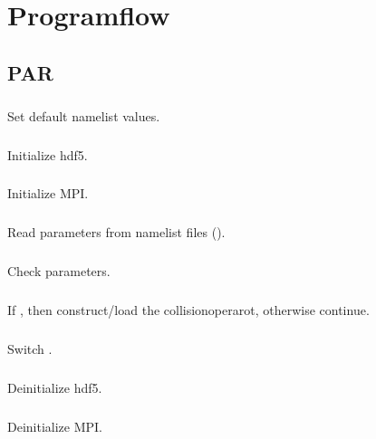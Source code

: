 \chapter{Programflow}

\section{PAR}

\paragraph{}
Set default namelist values.

\paragraph{}
Initialize hdf5.

\paragraph{}
Initialize MPI.

\paragraph{}
Read parameters from namelist files ().

\paragraph{}
Check parameters.

\paragraph{}
If , then construct/load the
collisionoperarot, otherwise continue.

\paragraph{}
Switch .

\paragraph{}
Deinitialize hdf5.

\paragraph{}
Deinitialize MPI.


